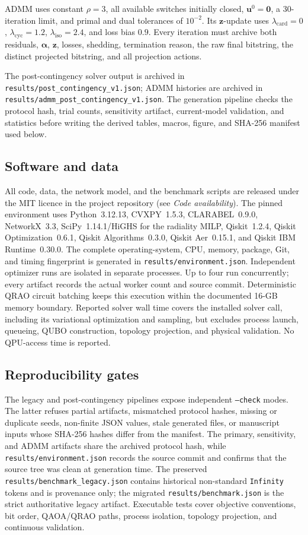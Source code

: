\documentclass[5p,twocolumn,number,sort&compress,nopreprintline]{elsarticle}
\newcommand{\code}[1]{\texttt{\small #1}}
\begin{document}
ADMM uses constant $\rho=3$, all available switches initially closed,
$\boldsymbol u^0=\boldsymbol 0$, a 30-iteration limit, and primal and dual tolerances of
$10^{-2}$. Its $\boldsymbol z$-update uses
$\lambda_{\mathrm{card}}=0$,
$\lambda_{\mathrm{cyc}}=1.2$,
$\lambda_{\mathrm{iso}}=2.4$, and loss bias $0.9$. Every iteration must
archive both residuals, $\boldsymbol\alpha$, $\boldsymbol z$, losses,
shedding, termination reason, the raw final bitstring, the distinct
projected bitstring, and all projection actions.

The post-contingency solver output is archived in
\code{results/post\_contingency\_v1.json}; ADMM histories are archived in
\code{results/admm\_post\_contingency\_v1.json}. The generation pipeline
checks the protocol hash, trial counts, sensitivity artifact,
current-model validation, and statistics before writing the derived
tables, macros, figure, and SHA-256 manifest used below.

\subsection{Software and data}
All code, data, the network model, and the benchmark scripts are
released under the MIT licence in the project repository (see
\emph{Code availability}). The pinned environment uses Python~3.12.13,
CVXPY~1.5.3, CLARABEL~0.9.0, NetworkX~3.3, SciPy~1.14.1/HiGHS for the
radiality MILP, Qiskit~1.2.4, Qiskit Optimization~0.6.1, Qiskit
Algorithms~0.3.0, Qiskit Aer~0.15.1, and Qiskit IBM Runtime~0.30.0.
The complete operating-system, CPU, memory, package, Git, and timing
fingerprint is generated in \code{results/environment.json}.
Independent optimizer runs are isolated in separate processes. Up to
four run concurrently; every artifact records the actual worker count
and source commit. Deterministic QRAO circuit batching keeps this
execution within the documented 16-GB memory boundary.
Reported solver wall time covers the installed solver call, including
its variational optimization and sampling, but excludes process launch,
queueing, QUBO construction, topology projection, and physical
validation. No QPU-access time is reported.

\subsection{Reproducibility gates}
The legacy and post-contingency pipelines expose independent
\code{--check} modes. The latter refuses partial artifacts, mismatched
protocol hashes, missing or duplicate seeds, non-finite JSON values,
stale generated files, or manuscript inputs whose SHA-256 hashes differ
from the manifest. The primary, sensitivity, and ADMM artifacts share
the archived protocol hash, while \code{results/environment.json}
records the source commit and confirms that the source tree was clean at
generation time. The preserved
\code{results/benchmark\_legacy.json} contains historical non-standard
\code{Infinity} tokens and is provenance only; the migrated
\code{results/benchmark.json} is the strict authoritative legacy
artifact. Executable tests cover objective conventions, bit order,
QAOA/QRAO paths, process isolation, topology projection, and continuous
validation.
\end{document}
